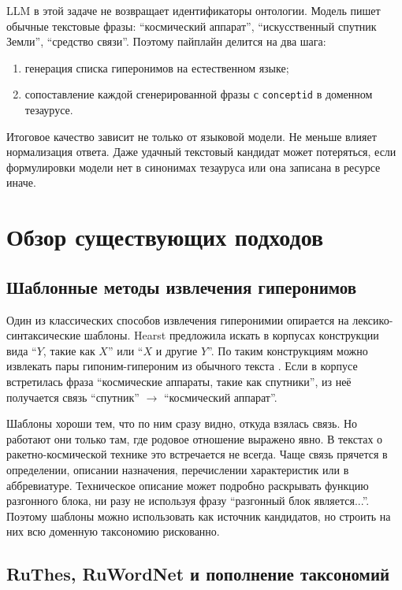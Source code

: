 \documentclass[12pt,a4paper,oneside,openany]{report}
\begin{document}
LLM в этой задаче не возвращает идентификаторы онтологии. Модель пишет обычные текстовые фразы: ``космический аппарат'', ``искусственный спутник Земли'', ``средство связи''. Поэтому пайплайн делится на два шага:
\begin{enumerate}
  \item генерация списка гиперонимов на естественном языке;
  \item сопоставление каждой сгенерированной фразы с \texttt{conceptid} в доменном тезаурусе.
\end{enumerate}

Итоговое качество зависит не только от языковой модели. Не меньше влияет нормализация ответа. Даже удачный текстовый кандидат может потеряться, если формулировки модели нет в синонимах тезауруса или она записана в ресурсе иначе.

\chapter{Обзор существующих подходов}

\section{Шаблонные методы извлечения гиперонимов}

Один из классических способов извлечения гиперонимии опирается на лексико-синтаксические шаблоны. Hearst предложила искать в корпусах конструкции вида ``$Y$, такие как $X$'' или ``$X$ и другие $Y$''. По таким конструкциям можно извлекать пары гипоним-гипероним из обычного текста \cite{hearst1992}. Если в корпусе встретилась фраза ``космические аппараты, такие как спутники'', из неё получается связь ``спутник'' $\rightarrow$ ``космический аппарат''.

Шаблоны хороши тем, что по ним сразу видно, откуда взялась связь. Но работают они только там, где родовое отношение выражено явно. В текстах о ракетно-космической технике это встречается не всегда. Чаще связь прячется в определении, описании назначения, перечислении характеристик или в аббревиатуре. Техническое описание может подробно раскрывать функцию разгонного блока, ни разу не используя фразу ``разгонный блок является...''. Поэтому шаблоны можно использовать как источник кандидатов, но строить на них всю доменную таксономию рискованно.

\section{RuThes, RuWordNet и пополнение таксономий}
\end{document}
